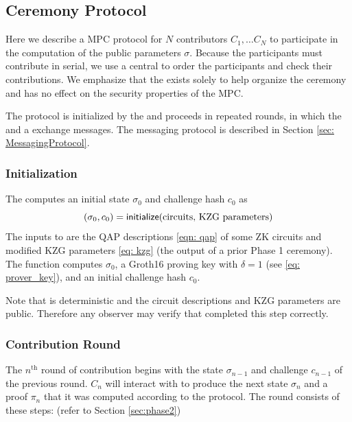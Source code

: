 \subsection{Ceremony Protocol}

Here we describe a MPC protocol for $N$ contributors $C_1, \ldots C_N$ to participate in the computation of the public parameters $\sigma$. Because the participants must contribute in serial, we use a central \Coordinator{} to order the participants and check their contributions. We emphasize that the \Coordinator{} exists solely to help organize the ceremony and has no effect on the security properties of the MPC.

The protocol is initialized by the \Coordinator{} and proceeds in repeated rounds, in which the \Coordinator{} and a \Contributor{} exchange messages. The messaging protocol is described in Section \ref{sec: MessagingProtocol}.

\subsubsection*{Initialization}

The \Coordinator{} computes an initial state $\sigma_0$ and challenge hash $c_0$ as 
\begin{equation*}
    (\sigma_0, c_0) =  {\textsf{initialize}}{}(\text{circuits, KZG parameters})
\end{equation*} 
The inputs to \initialize{} are the QAP descriptions \eqref{eqn: qap} of some ZK circuits and modified KZG parameters \eqref{eq: kzg} (the output of a prior Phase 1 ceremony). The function \initialize{} computes $\sigma_0$, a Groth16 proving key with $\delta = 1$ (see \eqref{eq: prover_key}), and an initial challenge hash $c_0$.

Note that \initialize{} is deterministic and the circuit descriptions and KZG parameters are public. Therefore any observer may verify that \Coordinator{} completed this step correctly.

\subsubsection*{Contribution Round}

The $n^{\text{th}}$ round of contribution begins with the state $\sigma_{n-1}$ and challenge $c_{n-1}$ of the previous round. \Contributor{} $C_n$ will interact with \Coordinator{} to produce the next state $\sigma_{n}$ and a proof $\pi_{n}$ that it was computed according to the protocol. The round consists of these steps: (refer to Section \ref{sec:phase2})

